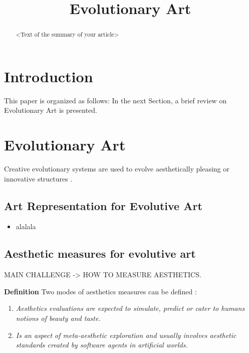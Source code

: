\documentclass[conference]{IEEEtran}
\title{Evolutionary Art}
\author{}
\begin{document}
\maketitle

\begin{abstract}
<Text of the summary of your article>
\end{abstract}

\section{Introduction}\label{intro}

This paper is organized as follows: In the next Section, a brief review on Evolutionary Art is presented. 

\section{Evolutionary Art}\label{evo_art}

Creative evolutionary systems are used to evolve aesthetically pleasing or innovative structures \cite{dipaola2009incorporating}.

\subsection{Art Representation for Evolutive Art} \label{evo_art:repr}
\begin{itemize}
	\item alalala
\end{itemize}

\subsection{Aesthetic measures for evolutive art}\label{evo_art:aesth}
MAIN CHALLENGE -> HOW TO MEASURE AESTHETICS.

{\bf Definition} Two modes of aesthetics measures can be defined \cite{galanter2012computational}: 

\begin{enumerate}
\item {\em Aesthetics evaluations are expected to simulate, predict or cater to humans notions of beauty and taste.} 
\item {\em Is an aspect of meta-aesthetic exploration and usually involves aesthetic standards created by software agents in artificial worlds.}
\end{enumerate}
\end{document}
